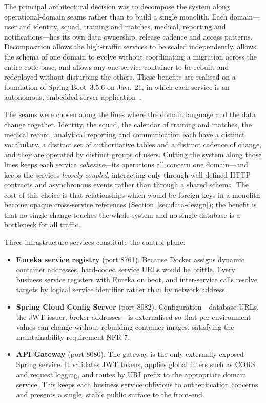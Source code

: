 The principal architectural decision was to decompose the system along
operational-domain seams rather than to build a single monolith. Each domain---user
and identity, squad, training and matches, medical, reporting and notifications---has
its own data ownership, release cadence and access patterns. Decomposition allows the
high-traffic services to be scaled independently, allows the schema of one domain to
evolve without coordinating a migration across the entire code base, and allows any
one service container to be rebuilt and redeployed without disturbing the others.
These benefits are realised on a foundation of Spring Boot~3.5.6 on Java~21, in which
each service is an autonomous, embedded-server application~\cite{springboot}.

The seams were chosen along the lines where the domain language and the data change
together. Identity, the squad, the calendar of training and matches, the medical
record, analytical reporting and communication each have a distinct vocabulary, a
distinct set of authoritative tables and a distinct cadence of change, and they are
operated by distinct groups of users. Cutting the system along those lines keeps each
service \emph{cohesive}---its operations all concern one domain---and keeps the
services \emph{loosely coupled}, interacting only through well-defined HTTP contracts
and asynchronous events rather than through a shared schema. The cost of this choice
is that relationships which would be foreign keys in a monolith become opaque
cross-service references (Section~\ref{sec:data-design}); the benefit is that no
single change touches the whole system and no single database is a bottleneck for all
traffic.

Three infrastructure services constitute the control plane:

\begin{itemize}
  \item \textbf{Eureka service registry} (port 8761). Because Docker assigns dynamic
  container addresses, hard-coded service URLs would be brittle. Every business
  service registers with Eureka on boot, and inter-service calls resolve targets by
  logical service identifier rather than by network address.

  \item \textbf{Spring Cloud Config Server} (port 8082). Configuration---database
  URLs, the JWT issuer, broker addresses---is externalised so that per-environment
  values can change without rebuilding container images, satisfying the maintainability
  requirement NFR-7.

  \item \textbf{API Gateway} (port 8080). The gateway is the only externally exposed
  Spring service. It validates JWT tokens, applies global filters such as CORS and
  request logging, and routes by URI prefix to the appropriate domain service. This
  keeps each business service oblivious to authentication concerns and presents a
  single, stable public surface to the front-end.
\end{itemize}

